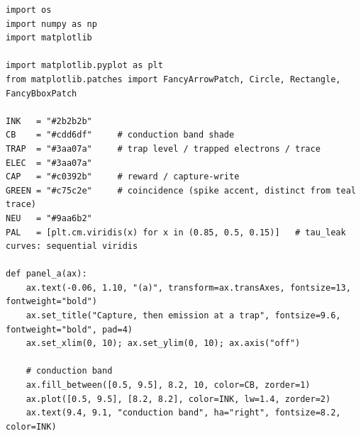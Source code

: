 \begin{lstlisting}[caption={schematics.ipynb code cell 4},label={lst:mrl-nb-schematics-4}]
import os
import numpy as np
import matplotlib

import matplotlib.pyplot as plt
from matplotlib.patches import FancyArrowPatch, Circle, Rectangle, FancyBboxPatch

INK   = "#2b2b2b"
CB    = "#cdd6df"     # conduction band shade
TRAP  = "#3aa07a"     # trap level / trapped electrons / trace
ELEC  = "#3aa07a"
CAP   = "#c0392b"     # reward / capture-write
GREEN = "#c75c2e"     # coincidence (spike accent, distinct from teal trace)
NEU   = "#9aa6b2"
PAL   = [plt.cm.viridis(x) for x in (0.85, 0.5, 0.15)]   # tau_leak curves: sequential viridis

def panel_a(ax):
    ax.text(-0.06, 1.10, "(a)", transform=ax.transAxes, fontsize=13, fontweight="bold")
    ax.set_title("Capture, then emission at a trap", fontsize=9.6, fontweight="bold", pad=4)
    ax.set_xlim(0, 10); ax.set_ylim(0, 10); ax.axis("off")

    # conduction band
    ax.fill_between([0.5, 9.5], 8.2, 10, color=CB, zorder=1)
    ax.plot([0.5, 9.5], [8.2, 8.2], color=INK, lw=1.4, zorder=2)
    ax.text(9.4, 9.1, "conduction band", ha="right", fontsize=8.2, color=INK)


\end{lstlisting}
